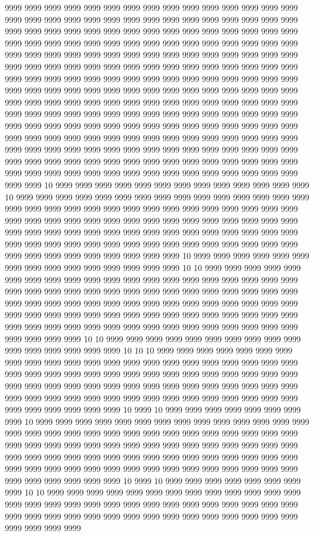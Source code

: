 9999 9999 9999 9999 9999 9999 9999 9999 9999 9999 9999 9999 9999 9999 9999 9999 9999 9999 9999 9999 9999 9999 9999 9999 9999 9999 9999 9999 9999 9999 9999 9999 9999 9999 9999 9999 9999 9999 9999 9999 9999 9999 9999 9999 9999 9999 9999 9999 9999 9999 9999 9999 9999 9999 9999 9999 9999 9999 9999 9999 9999 9999 9999 9999 9999 9999 9999 9999 9999 9999 9999 9999 9999 9999 9999 9999 9999 9999 9999 9999 9999 9999 9999 9999 9999 9999 9999 9999 9999 9999 9999 9999 9999 9999 9999 9999 9999 9999 9999 9999 9999 9999 9999 9999 9999 9999 9999 9999 9999 9999 9999 9999 9999 9999 9999 9999 9999 9999 9999 9999 9999 9999 9999 9999 9999 9999 9999 9999 9999 9999 9999 9999 9999 9999 9999 9999 9999 9999 9999 9999 9999 9999 9999 9999 9999 9999 9999 9999 9999 9999 9999 9999 9999 9999 9999 9999 9999 9999 9999 9999 9999 9999 9999 9999 9999 9999 9999 9999 9999 9999 9999 9999 9999 9999 9999 9999 9999 9999 9999 9999 9999 9999 9999 9999 9999 9999 9999 9999 9999 9999 9999 9999 9999 9999 9999 9999 9999 9999 9999 9999 9999 9999 9999 9999 9999 9999 9999 9999 9999 9999 9999 9999 9999 9999 9999 9999 9999 9999 9999 9999 9999 9999 9999 9999 9999 9999 9999 10 9999 9999 9999 9999 9999 9999 9999 9999 9999 9999 9999 9999 9999 10 9999 9999 9999 9999 9999 9999 9999 9999 9999 9999 9999 9999 9999 9999 9999 9999 9999 9999 9999 9999 9999 9999 9999 9999 9999 9999 9999 9999 9999 9999 9999 9999 9999 9999 9999 9999 9999 9999 9999 9999 9999 9999 9999 9999 9999 9999 9999 9999 9999 9999 9999 9999 9999 9999 9999 9999 9999 9999 9999 9999 9999 9999 9999 9999 9999 9999 9999 9999 9999 9999 9999 9999 9999 9999 9999 9999 9999 9999 9999 9999 9999 9999 9999 9999 10 9999 9999 9999 9999 9999 9999 9999 9999 9999 9999 9999 9999 9999 9999 9999 10 10 9999 9999 9999 9999 9999 9999 9999 9999 9999 9999 9999 9999 9999 9999 9999 9999 9999 9999 9999 9999 9999 9999 9999 9999 9999 9999 9999 9999 9999 9999 9999 9999 9999 9999 9999 9999 9999 9999 9999 9999 9999 9999 9999 9999 9999 9999 9999 9999 9999 9999 9999 9999 9999 9999 9999 9999 9999 9999 9999 9999 9999 9999 9999 9999 9999 9999 9999 9999 9999 9999 9999 9999 9999 9999 9999 9999 9999 9999 9999 9999 9999 9999 9999 9999 10 10 9999 9999 9999 9999 9999 9999 9999 9999 9999 9999 9999 9999 9999 9999 9999 9999 10 10 10 9999 9999 9999 9999 9999 9999 9999 9999 9999 9999 9999 9999 9999 9999 9999 9999 9999 9999 9999 9999 9999 9999 9999 9999 9999 9999 9999 9999 9999 9999 9999 9999 9999 9999 9999 9999 9999 9999 9999 9999 9999 9999 9999 9999 9999 9999 9999 9999 9999 9999 9999 9999 9999 9999 9999 9999 9999 9999 9999 9999 9999 9999 9999 9999 9999 9999 9999 9999 9999 9999 9999 9999 9999 10 9999 10 9999 9999 9999 9999 9999 9999 9999 9999 10 9999 9999 9999 9999 9999 9999 9999 9999 9999 9999 9999 9999 9999 9999 9999 9999 9999 9999 9999 9999 9999 9999 9999 9999 9999 9999 9999 9999 9999 9999 9999 9999 9999 9999 9999 9999 9999 9999 9999 9999 9999 9999 9999 9999 9999 9999 9999 9999 9999 9999 9999 9999 9999 9999 9999 9999 9999 9999 9999 9999 9999 9999 9999 9999 9999 9999 9999 9999 9999 9999 9999 9999 9999 9999 9999 9999 9999 9999 9999 9999 10 9999 10 9999 9999 9999 9999 9999 9999 9999 9999 10 10 9999 9999 9999 9999 9999 9999 9999 9999 9999 9999 9999 9999 9999 9999 9999 9999 9999 9999 9999 9999 9999 9999 9999 9999 9999 9999 9999 9999 9999 9999 9999 9999 9999 9999 9999 9999 9999 9999 9999 9999 9999 9999 9999 9999 9999 9999 9999 